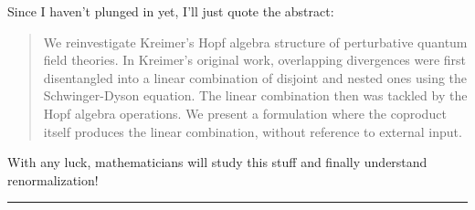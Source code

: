 Since I haven't plunged in yet, I'll just quote the abstract:

\begin{quote}
        We reinvestigate Kreimer's Hopf algebra structure of perturbative
	quantum field theories. In Kreimer's original work, overlapping
	divergences were first disentangled into a linear combination
	of disjoint and nested ones using the Schwinger-Dyson
	equation. The linear combination then was tackled by the Hopf
	algebra operations. We present a formulation where the
	coproduct itself produces the linear combination, without
	reference to external input.
\end{quote}
With any luck, mathematicians will study this stuff and finally understand
renormalization!










 \par\noindent\rule{\textwidth}{0.4pt}

